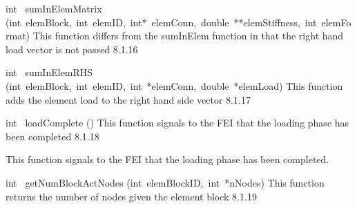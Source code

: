 \documentclass{article}
\begin{document}
\begin{cxxentry}
\begin{cxxentry}
\begin{cxxfunction}
\begin{cxxdoc}
\end{cxxdoc}
\end{cxxfunction}
\begin{cxxfunction}
{int\ }
        {sumInElemMatrix}
        {(int\ elemBlock,\ int\ elemID,\ int*\ elemConn,\ double\ **elemStiffness,\ int\ elemFormat)}
        {
This function differs from the sumInElem function in that the right hand
load vector is not passed}
        {8.1.16}
\begin{cxxdoc}

\end{cxxdoc}
\end{cxxfunction}
\begin{cxxfunction}
{int\ }
        {sumInElemRHS}
        {(int\ elemBlock,\ int\ elemID,\ int\ *elemConn,\ double\ *elemLoad)}
        {
This function adds the element load to the right hand side vector
}
        {8.1.17}
\begin{cxxdoc}

\end{cxxdoc}
\end{cxxfunction}
\begin{cxxfunction}
{int\ }
        {loadComplete}
        {()}
        {
This function signals to the FEI that the loading phase has
been completed}
        {8.1.18}
\begin{cxxdoc}

This function signals to the FEI that the loading phase has
been completed. 

\end{cxxdoc}
\end{cxxfunction}
\begin{cxxfunction}
{int\ }
        {getNumBlockActNodes}
        {(int\ elemBlockID,\ int\ *nNodes)}
        {
This function returns the number of nodes given the element block}
        {8.1.19}
\begin{cxxdoc}


\end{cxxdoc}
\end{cxxfunction}
\end{cxxentry}
\end{cxxentry}
\end{document}
